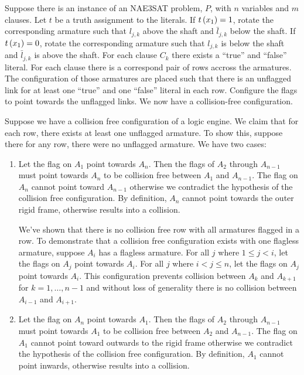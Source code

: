 \begin{pf}
Suppose there is an instance of an NAE3SAT problem, $P$, with $n$ variables and $m$ clauses.  Let 
$t$ be a truth assignment to the literals.  If $t \left( x_1 \right) = 1$, rotate the corresponding armature 
such that $l_{j,k}$ above the shaft and $\bar{l}_{j,k}$ below the shaft.  If $t \left( x_1 \right) = 0$, 
rotate the corresponding armature such that $l_{j,k}$ is below the shaft and $\bar{l}_{j,k}$ is 
above the shaft.  For each clause $C_k$ there exists a ``true'' and ``false'' literal.  For each 
clause 
there is a correspond pair of rows accross the armatures.  The configuration of those armatures are 
placed such that there is an unflagged link for at least one ``true'' and one ``false'' literal in 
each row.  Configure the flags to point towards the unflagged links. We now have a collision-free 
configuration.

Suppose we have a collision free configuration of a logic engine. We claim that for each row, there 
exists at least one unflagged armature.  To show this, suppose there for any row, there were no 
unflagged armature.  We have two cases:
\begin{enumerate}
 \item Let the flag on $A_1$ point towards $A_n$. Then the flags of $A_2$ through $A_{n-1}$ must 
point towards $A_n$ to be collision free between $A_1$ and $A_{n-1}$.  The flag on $A_n$ cannot 
point toward $A_{n-1}$ otherwise we contradict the hypothesis of the collision free configuration.  
By definition, $A_n$ cannot point towards the outer rigid frame, otherwise results into a 
collision.  

We've shown that there is no collision free row with all armatures flagged in a row.  
To demonstrate that a collision free configuration exists with one flagless armature, suppose $A_i$ 
has a flagless armature.  For all $j$ where $ 1 \leq j < i$, let the flags on $A_j$ point towards 
$A_i$. For all $j$ where $ i < j \leq n$, let the flags on $A_j$ point towards 
$A_i$.  This configuration prevents collision between $A_k$ and $A_{k+1}$ for $k = 1,\dots,n-1$ and 
without loss of generality there is no collision between $A_{i-1}$ and $A_{i+1}$.
\item Let the flag on $A_n$ point towards $A_1$. Then the flags of $A_2$ through $A_{n-1}$ must 
point towards $A_1$ to be collision free between $A_2$ and $A_{n-1}$.  The flag on $A_1$ cannot 
point toward outwards to the rigid frame otherwise we contradict the hypothesis of the collision 
free configuration.  By definition, $A_1$ cannot point inwards, otherwise results into a 
collision.  


\end{enumerate}
\end{pf}

